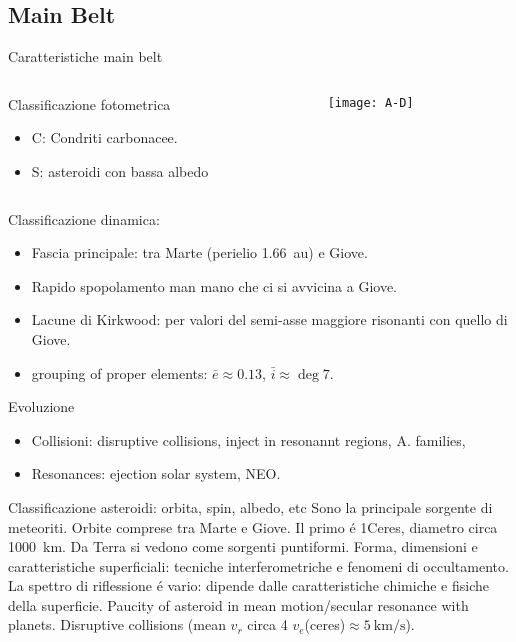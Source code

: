 \subsection{Main Belt}

\begin{frame}{Caratteristiche main belt}
\begin{columns}[T]\begin{column}{0.5\textwidth}
\begin{block}{Classificazione fotometrica}
\begin{itemize}
    \item C: Condriti carbonacee.
    \item S: asteroidi con bassa albedo
\end{itemize}
\end{block}
\end{column}\begin{column}{0.5\textwidth}
\begin{figure}[!ht]\texttt{[image: A-D]}\end{figure}
\end{column} \end{columns}
\begin{block}{Classificazione dinamica:}
\begin{itemize}
\item Fascia principale: tra Marte (perielio \SI{1.66}{\astronomicalunit}) e Giove.
\item Rapido spopolamento man mano che ci si avvicina a Giove.
\item Lacune di Kirkwood: per valori del semi-asse maggiore risonanti con quello di Giove.
\item grouping of proper elements: $\bar{e}\approx0.13$, $\bar{i}\approx\deg{7}$.
\end{itemize}
\end{block}
\begin{block}{Evoluzione}
\begin{itemize}
\item Collisioni: disruptive collisions, inject in resonannt regions, A. families,
\item Resonances: ejection solar system, NEO.
\end{itemize}
\end{block}
\end{frame}

\begin{wordonframe}{Classificazione asteroidi: orbita, spin, albedo, etc}
Sono la principale sorgente di meteoriti.
Orbite comprese tra Marte e Giove. Il primo \'e 1Ceres, diametro circa \SI{1000}{\kilo\meter}.
Da Terra si vedono come sorgenti puntiformi. Forma, dimensioni e caratteristiche superficiali: tecniche interferometriche e fenomeni di occultamento.
La spettro di riflessione \'e vario: dipende dalle caratteristiche chimiche e fisiche della superficie.
Paucity of asteroid in mean motion/secular resonance with planets.
Disruptive collisions (mean $v_r$ circa 4 $v_e$(ceres)$\approx\SI{5}{\kilo\meter\per\second}$).
\end{wordonframe}

